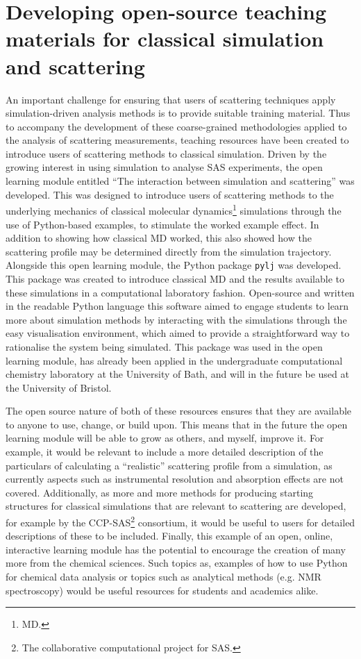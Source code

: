 \section{Developing open-source teaching materials for classical simulation and scattering}
An important challenge for ensuring that users of scattering techniques apply simulation-driven analysis methods is to provide suitable training material.
Thus to accompany the development of these coarse-grained methodologies applied to the analysis of scattering measurements, teaching resources have been created to introduce users of scattering methods to classical simulation.
Driven by the growing interest in using simulation to analyse SAS experiments, the open learning module entitled ``The interaction between simulation and scattering'' was developed.
This was designed to introduce users of scattering methods to the underlying mechanics of classical molecular dynamics\footnote{MD.} simulations through the use of Python-based examples, to stimulate the worked example effect.
In addition to showing how classical MD worked, this also showed how the scattering profile may be determined directly from the simulation trajectory.
Alongside this open learning module, the Python package \texttt{pylj} was developed.
This package was created to introduce classical MD and the results available to these simulations in a computational laboratory fashion.
Open-source and written in the readable Python language this software aimed to engage students to learn more about simulation methods by interacting with the simulations through the easy visualisation environment, which aimed to provide a straightforward way to rationalise the system being simulated.
This package was used in the open learning module, has already been applied in the undergraduate computational chemistry laboratory at the University of Bath, and will in the future be used at the University of Bristol.

The open source nature of both of these resources ensures that they are available to anyone to use, change, or build upon.
This means that in the future the open learning module will be able to grow as others, and myself, improve it.
For example, it would be relevant to include a more detailed description of the particulars of calculating a ``realistic'' scattering profile from a simulation, as currently aspects such as instrumental resolution and absorption effects are not covered.
Additionally, as more and more methods for producing starting structures for classical simulations that are relevant to scattering are developed, for example by the CCP-SAS\footnote{The collaborative computational project for SAS.} consortium, it would be useful to users for detailed descriptions of these to be included.
Finally, this example of an open, online, interactive learning module has the potential to encourage the creation of many more from the chemical sciences.
Such topics as, examples of how to use Python for chemical data analysis or topics such as analytical methods (e.g. NMR spectroscopy) would be useful resources for students and academics alike.

